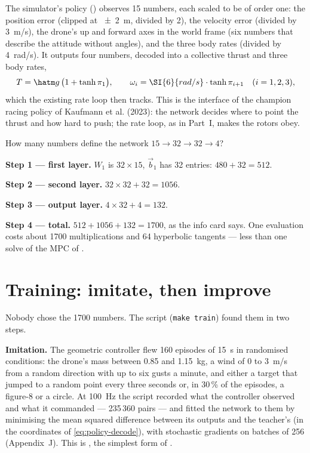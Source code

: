 The simulator's policy () observes 15 numbers, each scaled to be of order one: the position error (clipped at \SI{\pm2}{m}, divided by 2), the velocity error (divided by \SI{3}{m/s}), the drone's up and forward axes in the world frame (six numbers that describe the attitude without angles), and the three body rates (divided by \SI{4}{rad/s}). It outputs four numbers, decoded into a collective thrust and three body rates,
\begin{equation}\label{eq:policy-decode}
  T = \hatm g\,\big(1 + \tanh\pi_1\big), \qquad \omega_i = \SI{6}{rad/s}\cdot\tanh\pi_{i+1}\quad(i = 1, 2, 3),
\end{equation}
which the existing rate loop then tracks. This is the interface of the champion racing policy of Kaufmann et al. (2023): the network decides where to point the thrust and how hard to push; the rate loop, as in Part~I, makes the rotors obey.

\begin{example}
\label{ex:policy-count}
How many numbers define the network $15 \to 32 \to 32 \to 4$?

\textbf{Step 1 — first layer.} $W_1$ is $32 \times 15$, $\vec b_1$ has 32 entries: $480 + 32 = 512$.

\textbf{Step 2 — second layer.} $32 \times 32 + 32 = 1056$.

\textbf{Step 3 — output layer.} $4 \times 32 + 4 = 132$.

\textbf{Step 4 — total.} $512 + 1056 + 132 = 1700$, as the info card says. One evaluation costs about 1700 multiplications and 64 hyperbolic tangents — less than one solve of the MPC of .
\end{example}

\section{Training: imitate, then improve}

Nobody chose the 1700 numbers. The script  (\texttt{make train}) found them in two steps.

\textbf{Imitation.} The geometric controller flew 160 episodes of \SI{15}{s} in randomised conditions: the drone's mass between 0.85 and \SI{1.15}{kg}, a wind of 0 to \SI{3}{m/s} from a random direction with up to six gusts a minute, and either a target that jumped to a random point every three seconds or, in 30\,\% of the episodes, a figure-8 or a circle. At \SI{100}{Hz} the script recorded what the controller observed and what it commanded — 235\,360 pairs — and fitted the network to them by minimising the mean squared difference between its outputs and the teacher's (in the coordinates of \cref{eq:policy-decode}), with stochastic gradients on batches of 256 (Appendix~J). This is , the simplest form of .

